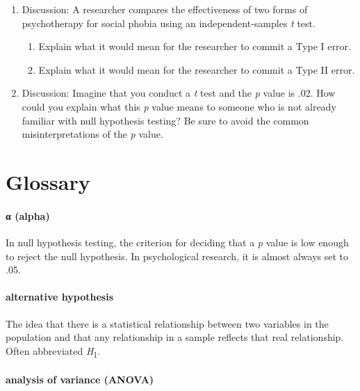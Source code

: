 \documentclass[
]{krantz}
\providecommand{\tightlist}{%
  \setlength{\itemsep}{0pt}\setlength{\parskip}{0pt}}
\begin{document}
\begin{enumerate}
\def\labelenumi{\arabic{enumi}.}
\tightlist
\item
  Discussion: A researcher compares the effectiveness of two forms of psychotherapy for social phobia using an independent-samples \emph{t} test.

  \begin{enumerate}
  \def\labelenumii{\alph{enumii}.}
  \tightlist
  \item
    Explain what it would mean for the researcher to commit a Type I error.
  \item
    Explain what it would mean for the researcher to commit a Type II error.
  \end{enumerate}
\item
  Discussion: Imagine that you conduct a \emph{t} test and the \emph{p} value is .02. How could you explain what this \emph{p} value means to someone who is not already familiar with null hypothesis testing? Be sure to avoid the common misinterpretations of the \emph{p} value.
\end{enumerate}

\section{Glossary}\label{glossary-13}

\paragraph*{α (alpha)}\label{ux3b1-alpha}

In null hypothesis testing, the criterion for deciding that a \emph{p} value is low enough to reject the null hypothesis. In psychological research, it is almost always set to .05.

\paragraph*{alternative hypothesis}\label{alternative-hypothesis}

The idea that there is a statistical relationship between two variables in the population and that any relationship in a sample reflects that real relationship. Often abbreviated \emph{H}\textsubscript{1}.

\paragraph*{analysis of variance (ANOVA)}\label{analysis-of-variance-anova}
\end{document}
